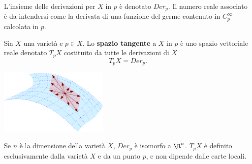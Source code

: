 \documentclass[10pt, letterpaper]{report}
\begin{document}
L'insieme delle derivazioni per $X$ in $p$ è denotato $Der_p$. Il numero reale associato è da intendersi come la derivata di una funzione del germe contenuto in $C^\infty_p$ calcolata in $p$.
\begin{definizione}
     Sia $X$ una varietà e $p\in X$. Lo \textbf{spazio tangente} a $X$ in $p$ è uno spazio vettoriale reale denotato $T_pX$ costituito da tutte le derivazioni di $X$\begin{equation}
        T_pX=Der_p.
     \end{equation}
\end{definizione}
\begin{center}
     \includegraphics[width=0.4\textwidth ]{images/spazio_tangente.pdf}
\end{center}
Se $n$ è la dimensione della varietà $X$, $Der_p$ è isomorfo a $\R^n$. $T_pX$ è definito esclusivamente dalla varietà $X$ e da un punto $p$, e non dipende dalle carte locali.\bigskip
\end{document}
